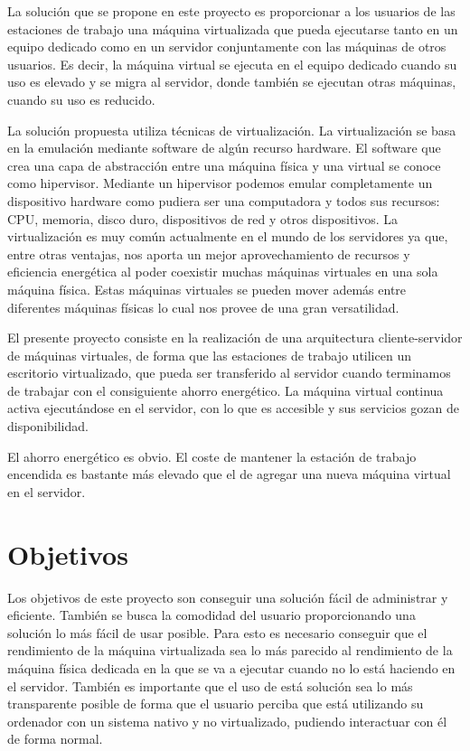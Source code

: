 \documentclass[spanisheDIVcalc,twoside,parskip-,pointlessnumbers,final]{scrbook}
\begin{document}
La solución que se propone en este proyecto es proporcionar a los
usuarios de las estaciones de trabajo una máquina virtualizada que
pueda ejecutarse tanto en un equipo dedicado como en un servidor conjuntamente
con las máquinas de otros usuarios. Es decir, la máquina virtual se
ejecuta en el equipo dedicado cuando su uso es elevado y se migra
al servidor, donde también se ejecutan otras máquinas, cuando su uso
es reducido.

La solución propuesta utiliza técnicas de virtualización. La virtualización
se basa en la emulación mediante software de algún recurso hardware.
El software que crea una capa de abstracción entre una máquina física
y una virtual se conoce como hipervisor. Mediante un hipervisor podemos
emular completamente un dispositivo hardware como pudiera ser una
computadora y todos sus recursos: CPU, memoria, disco duro, dispositivos
de red y otros dispositivos. La virtualización es muy común actualmente
en el mundo de los servidores ya que, entre otras ventajas, nos aporta
un mejor aprovechamiento de recursos y eficiencia energética al poder
coexistir muchas máquinas virtuales en una sola máquina física. Estas
máquinas virtuales se pueden mover además entre diferentes máquinas
físicas lo cual nos provee de una gran versatilidad.

El presente proyecto consiste en la realización de una arquitectura
cliente-servidor de máquinas virtuales, de forma que las estaciones
de trabajo utilicen un escritorio virtualizado, que pueda ser transferido
al servidor cuando terminamos de trabajar con el consiguiente ahorro
energético. La máquina virtual continua activa ejecutándose en el
servidor, con lo que es accesible y sus servicios gozan de disponibilidad.

El ahorro energético es obvio. El coste de mantener la estación de
trabajo encendida es bastante más elevado que el de agregar una nueva
máquina virtual en el servidor.


\section{Objetivos}

Los objetivos de este proyecto son conseguir una solución fácil de
administrar y eficiente. También se busca la comodidad del usuario
proporcionando una solución lo más fácil de usar posible. Para esto
es necesario conseguir que el rendimiento de la máquina virtualizada
sea lo más parecido al rendimiento de la máquina física dedicada en
la que se va a ejecutar cuando no lo está haciendo en el servidor.
También es importante que el uso de está solución sea lo más transparente
posible de forma que el usuario perciba que está utilizando su ordenador
con un sistema nativo y no virtualizado, pudiendo interactuar con
él de forma normal.
\end{document}
